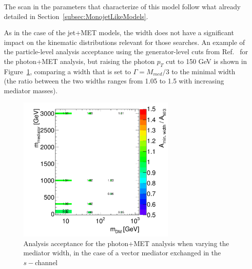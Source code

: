 The scan in the parameters that characterize of this model follow what
already detailed in Section~\ref{subsec:MonojetLikeModels}. 


As in the case of the jet+MET models, the width does not have a significant
impact on the kinematic distributions relevant for those searches. An example
of the particle-level analysis acceptance using the
generator-level cuts from Ref.~\cite{Aad:2014tda} 
for the photon+MET analysis, but raising the photon $p_T$ cut
to 150 GeV is shown in Figure~\ref{fig:DMV_EW_gamma_acceptance}, 
comparing a width that is set to $\Gamma=M_{med}/3$ to the
minimal width (the ratio between the two widths 
ranges from 1.05 to 1.5 with increasing mediator masses).


\begin{figure}
    \includegraphics[width=0.7\textwidth]{figures/EW/acceptance_minwidth_vs_mo3_gamma}
    \caption{Analysis acceptance for the photon+MET analysis when varying the mediator width, in the
    case of a vector mediator exchanged in the $s-$channel}%
    \label{fig:DMV_EW_gamma_acceptance}
\end{figure}

